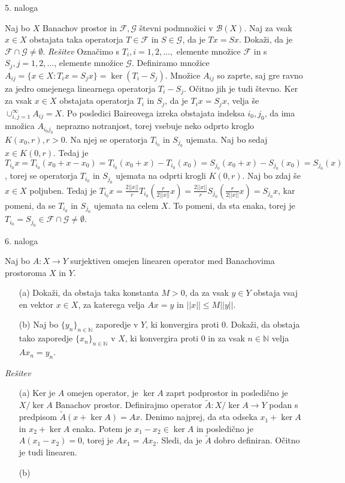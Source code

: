 \documentclass[a4paper, 12pt]{article}
\newcommand{\N}{\mathbb{N}}
\begin{document}
\begin{flushleft}
5. naloga
\end{flushleft}
Naj bo $X$ Banachov prostor in $\mathcal{F}, \mathcal{G}$ števni podmnožici v $\mathcal{B}(X)$. Naj za vsak $x\in X$ obstajata taka operatorja $T\in \mathcal{F}$ in $S\in \mathcal{G}$, da je $Tx = Sx$. Dokaži, da je $\mathcal{F} \cap \mathcal{G} \neq \emptyset$.
\newline
\emph{Rešitev}
\newline
Označimo s $T_i, i=1,2,\dots,$ elemente množice $\mathcal{F}$ in s $S_j, j=1,2,\dots$, elemente množice $\mathcal{G}$. Definiramo množice $A_{ij} = \{x\in X: T_i x = S_jx\} = \ker(T_i - S_j)$. Množice $A_{ij}$ so zaprte, saj gre ravno za jedro omejenega linearnega operatorja $T_i-S_j$. Očitno jih je tudi števno. Ker za vsak $x\in X$ obstajata operatorja $T_i$ in $S_j$, da je $T_i x = S_j x$, velja še $\cup_{i,j=1}^{\infty} A_{ij} = X$. Po posledici Baireovega izreka obstajata indeksa $i_0, j_0$, da ima množica $A_{i_0 j_0}$ neprazno notranjost, torej vsebuje neko odprto kroglo $K(x_0,r),r>0$. Na njej se operatorja $T_{i_0}$ in $S_{j_0}$ ujemata. Naj bo sedaj $x\in K(0,r)$. Tedaj je $T_{i_0} x = T_{i_0}(x_0 + x - x_0)= T_{i_0} (x_0 + x) - T_{i_0}(x_0)= S_{j_0}(x_0+x)-S_{j_0}(x_0) = S_{j_0}(x)$, torej se operatorja $T_{i_0}$ in $S_{j_0}$ ujemata na odprti krogli $K(0,r)$. Naj bo zdaj še $x\in X$ poljuben. Tedaj je $T_{i_0}x = \frac{2||x||}{r}T_{i_0}(\frac{r}{2||x||}x) =\frac{2||x||}{r}S_{j_0}(\frac{r}{2||x||}x) = S_{j_0}x$, kar pomeni, da se $T_{i_0}$ in $S_{j_0}$ ujemata na celem $X$. To pomeni, da sta enaka, torej je $T_{i_0} = S_{j_0}\in \mathcal{F}\cap \mathcal{G}\neq \emptyset$.


\begin{flushleft}
6. naloga
\end{flushleft}
Naj bo $A:X\rightarrow Y$ surjektiven omejen linearen operator med Banachovima prostoroma $X$ in $Y$.
\begin{enumerate}	
\item[(a)] Dokaži, da obstaja taka konstanta $M> 0$, da za vsak $y\in Y$ obstaja vsaj en vektor $x\in X$, za katerega velja $Ax = y$ in $||x|| \le M ||y||$.
\item[(b)] Naj bo $\{y_n\}_{n\in \N}$ zaporedje v $Y$, ki konvergira proti 0. Dokaži, da obstaja tako zaporedje $\{x_n\}_{n\in \N}$ v $X$, ki konvergira proti 0 in za vsak $n\in \N$ velja $Ax_n = y_n$.
\end{enumerate}
\emph{Rešitev}
\begin{enumerate}
\item[(a)]Ker je $A$ omejen operator, je $\ker A$ zaprt podprostor in posledično je $X/\ker A$ Banachov prostor. Definirajmo operator $\tilde{A}: X/\ker A \rightarrow Y$ podan s predpisom $\tilde{A}(x+\ker A) = Ax$. Denimo najprej, da sta odseka $x_1 + \ker A$ in $x_2 + \ker A$ enaka. Potem je $x_1 - x_2 \in \ker A$ in posledično je $A(x_1 - x_2)=0 $, torej je $Ax_1 = Ax_2$. Sledi, da je $\tilde{A}$ dobro definiran. Očitno je tudi linearen.
\item[(b)]
\end{enumerate}
\end{document}
